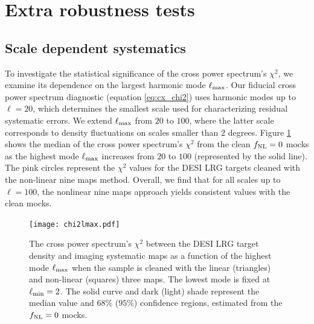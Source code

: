 \section{Extra robustness tests}

\subsection{Scale dependent systematics}\label{sec:scalesys}
To investigate the statistical significance of the cross power spectrum's $\chi^{2}$, we examine its dependence on the largest harmonic mode $\ell_{\rm max}$. Our fiducial cross power spectrum diagnostic (equation \ref{eq:cx_chi2}) uses harmonic modes up to $\ell=20$, which determines the smallest scale used for characterizing residual systematic errors. We extend $\ell_{\rm max}$ from $20$ to $100$, where the latter scale corresponds to density fluctuations on scales smaller than $2$ degrees. Figure \ref{fig:chi2cellextend} shows the median of the  cross power spectrum's $\chi^{2}$ from the clean $f_{\rm NL}=0$ mocks  as the highest mode $\ell_{\rm max}$ increases from $20$ to $100$ (represented by the solid line). The pink circles represent the $\chi^{2}$ values for the DESI LRG targets cleaned with the non-linear nine maps method. Overall, we find that for all scales up to $\ell=100$, the nonlinear nine maps approach yields consistent values with the clean mocks.

\begin{figure}
\centering
\texttt{[image: chi2lmax.pdf]}
\caption{The cross power spectrum's $\chi^{2}$ between the DESI LRG target density and imaging systematic maps as a function of the highest mode $\ell_{\rm max}$ when the sample is cleaned with the linear (triangles) and non-linear (squares) three maps. The lowest mode is fixed at $\ell_{\rm min}=2$. The solid curve and dark (light) shade represent the median value and $68\%$ ($95\%$) confidence regions, estimated from the $f_{\rm NL}=0$ mocks.}\label{fig:chi2cellextend}
\end{figure}


